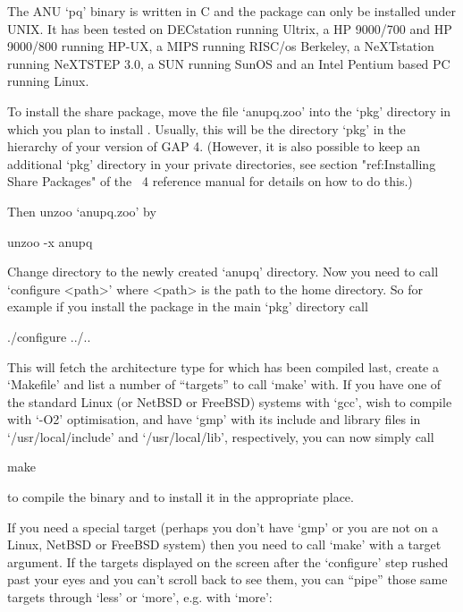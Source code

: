 

The ANU `pq' binary is written in C and the package can only be installed
under UNIX. It has  been  tested  on  DECstation  running  Ultrix,  a  HP
9000/700 and HP 9000/800 running HP-UX, a MIPS running RISC/os  Berkeley,
a NeXTstation running NeXTSTEP 3.0, a SUN  running  SunOS  and  an  Intel
Pentium based PC running Linux.

To install the {\ANUPQ} share package, move the file `anupq.zoo' into the
`pkg' directory in which you plan to install {\ANUPQ}. Usually, this will
be the directory `pkg' in  the  hierarchy  of  your  version  of  GAP  4.
(However, it is also possible to keep an additional  `pkg'  directory  in
your private directories, see section "ref:Installing Share Packages"  of
the {\GAP}~4 reference manual for details on how to do this.)

Then unzoo `anupq.zoo' by

\begintt
unzoo -x anupq
\endtt

Change directory to the newly created `anupq' directory. Now you need  to
call `configure <path>' where <path> is  the  path  to  the  {\GAP}  home
directory. So for example if you install the package in  the  main  `pkg'
directory call

\begintt
./configure ../..
\endtt

This will fetch the architecture type for which {\GAP} has been  compiled
last, create a `Makefile' and list a number of ``targets'' to call `make'
with. If you have one of  the  standard  Linux  (or  NetBSD  or  FreeBSD)
systems with `gcc', wish to compile with  `-O2'  optimisation,  and  have
`gmp' with its include and  library  files  in  `/usr/local/include'  and
`/usr/local/lib', respectively, you can now simply call

\begintt
make
\endtt

to compile the binary and to install it in the appropriate place.

If you need a special target (perhaps you don't have `gmp' or you are not
on a Linux, NetBSD or FreeBSD system) then you need to call `make' with a
target argument. If  the  targets  displayed  on  the  screen  after  the
`configure' step rushed past your eyes and you can't scroll back  to  see
them, you can ``pipe'' those same targets through `less' or `more',  e.g.
with `more':

